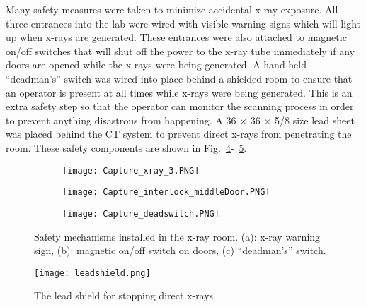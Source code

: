Many safety measures were taken to minimize accidental x-ray exposure.  All three entrances into the lab were wired with visible warning signs which will light up when x-rays are generated.  These entrances were also attached to magnetic on/off switches that will shut off the power to the x-ray tube immediately if any doors are opened while the x-rays were being generated.  A hand-held ``deadman's'' switch was wired into place behind a shielded room to ensure that an operator is present at all times while x-rays were being generated.  This is an extra safety step so that the operator can monitor the scanning process in order to prevent anything disastrous from happening.  A 36 \inches $\times$ 36 \inches $\times$ 5/8 \inches size lead sheet was placed behind the CT system to prevent direct x-rays from penetrating the room.  These safety components are shown in Fig.~\ref{fig:safetycomponents}-~\ref{fig:leadshield}.
%
\begin{figure}[h]
	\begin{subfigure}[b]{0.3\linewidth}
	\texttt{[image: Capture\_xray\_3.PNG]}
	\caption{}
	\label{fig:xraywarningsign}
	\end{subfigure}
\hspace{0.2cm}
	\begin{subfigure}[b]{0.3\linewidth}
	\texttt{[image: Capture\_interlock\_middleDoor.PNG]}
	\caption{}
	\label{fig:doorinterlock}
	\end{subfigure}	
\hspace{0.2cm}	
	\begin{subfigure}[b]{0.3\linewidth}
	\texttt{[image: Capture\_deadswitch.PNG]}
	\caption{}
	\label{fig:deadmanswitch}
	\end{subfigure}
\caption{Safety mechanisms installed in the x-ray room. (a): x-ray warning sign, (b): magnetic on/off switch on doors, (c) ``deadman's'' switch.}
\label{fig:safetycomponents}
\end{figure}
%
\begin{figure}[h]
\centering
\texttt{[image: leadshield.png]}	
\caption{The lead shield for stopping direct x-rays.}
\label{fig:leadshield}
\end{figure}

